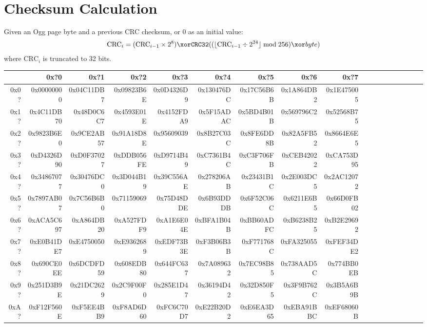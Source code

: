 \section{Checksum Calculation}
\label{ogg:checksum}
Given an Ogg page byte and a previous CRC checksum,
or 0 as an initial value:
\begin{equation*}
  \text{CRC}_i = (\text{CRC}_{i - 1} \times 2 ^ 8) \xor \texttt{CRC32}((\lfloor\text{CRC}_{i - 1} \div 2 ^ {24}\rfloor \bmod 256) \xor byte)
\end{equation*}
where $\text{CRC}_i$ is truncated to 32 bits.
\begin{table}[h]
{
  \ttfamily
  \begin{tabular}{|r||r|r|r|r|r|r|r|r|r|r|r|r|r|r|r|r|r|}
    \hline
    & 0x?0 & 0x?1 & 0x?2 & 0x?3 & 0x?4 & 0x?5 & 0x?6 & 0x?7 \\
    \hline
    0x0? & 0x00000000 & 0x04C11DB7 & 0x09823B6E & 0x0D4326D9 &
    0x130476DC & 0x17C56B6B & 0x1A864DB2 & 0x1E475005 \\
    0x1? & 0x4C11DB70 & 0x48D0C6C7 & 0x4593E01E & 0x4152FDA9 &
    0x5F15ADAC & 0x5BD4B01B & 0x569796C2 & 0x52568B75 \\
    0x2? & 0x9823B6E0 & 0x9CE2AB57 & 0x91A18D8E & 0x95609039 &
    0x8B27C03C & 0x8FE6DD8B & 0x82A5FB52 & 0x8664E6E5 \\
    0x3? & 0xD4326D90 & 0xD0F37027 & 0xDDB056FE & 0xD9714B49 &
    0xC7361B4C & 0xC3F706FB & 0xCEB42022 & 0xCA753D95 \\
    0x4? & 0x34867077 & 0x30476DC0 & 0x3D044B19 & 0x39C556AE &
    0x278206AB & 0x23431B1C & 0x2E003DC5 & 0x2AC12072 \\
    0x5? & 0x7897AB07 & 0x7C56B6B0 & 0x71159069 & 0x75D48DDE &
    0x6B93DDDB & 0x6F52C06C & 0x6211E6B5 & 0x66D0FB02 \\
    0x6? & 0xACA5C697 & 0xA864DB20 & 0xA527FDF9 & 0xA1E6E04E &
    0xBFA1B04B & 0xBB60ADFC & 0xB6238B25 & 0xB2E29692 \\
    0x7? & 0xE0B41DE7 & 0xE4750050 & 0xE9362689 & 0xEDF73B3E &
    0xF3B06B3B & 0xF771768C & 0xFA325055 & 0xFEF34DE2 \\
    0x8? & 0x690CE0EE & 0x6DCDFD59 & 0x608EDB80 & 0x644FC637 &
    0x7A089632 & 0x7EC98B85 & 0x738AAD5C & 0x774BB0EB \\
    0x9? & 0x251D3B9E & 0x21DC2629 & 0x2C9F00F0 & 0x285E1D47 &
    0x36194D42 & 0x32D850F5 & 0x3F9B762C & 0x3B5A6B9B \\
    0xA? & 0xF12F560E & 0xF5EE4BB9 & 0xF8AD6D60 & 0xFC6C70D7 &
    0xE22B20D2 & 0xE6EA3D65 & 0xEBA91BBC & 0xEF68060B \\

\end{tabular}}
\end{table}
